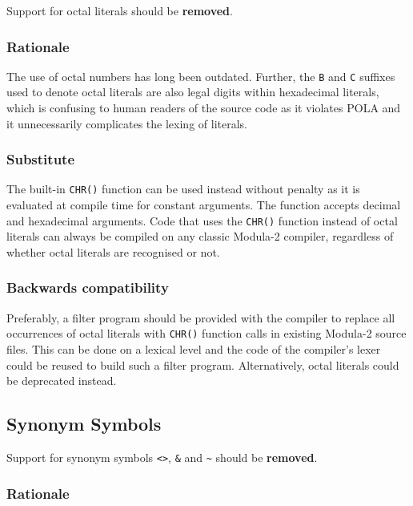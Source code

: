 \documentclass[10pt,a4paper]{article} %
\begin{document}
Support for octal literals should be \textbf{removed}.

\subsubsection{Rationale}

The use of octal numbers has long been outdated. Further, the \verb|B| and \verb|C| suffixes used to denote octal literals are also legal digits within hexadecimal literals, which is confusing to human readers of the source code as it violates POLA and it unnecessarily complicates the lexing of literals.

\subsubsection{Substitute}

The built-in \verb|CHR()| function can be used instead without penalty as it is evaluated at compile time for constant arguments. The function accepts decimal and hexadecimal arguments. Code that uses the \verb|CHR()| function instead of octal literals can always be compiled on any classic Modula-2 compiler, regardless of whether octal literals are recognised or not.

\subsubsection{Backwards compatibility}

Preferably, a filter program should be provided with the compiler to replace all occurrences of octal literals with \verb|CHR()| function calls in existing Modula-2 source files. This can be done on a lexical level and the code of the compiler's lexer could be reused to build such a filter program. Alternatively, octal literals could be deprecated instead.


\subsection{Synonym Symbols}

Support for synonym symbols \verb|<>|, \verb|&| and \verb|~| should be \textbf{removed}.

\subsubsection{Rationale}
\end{document}

